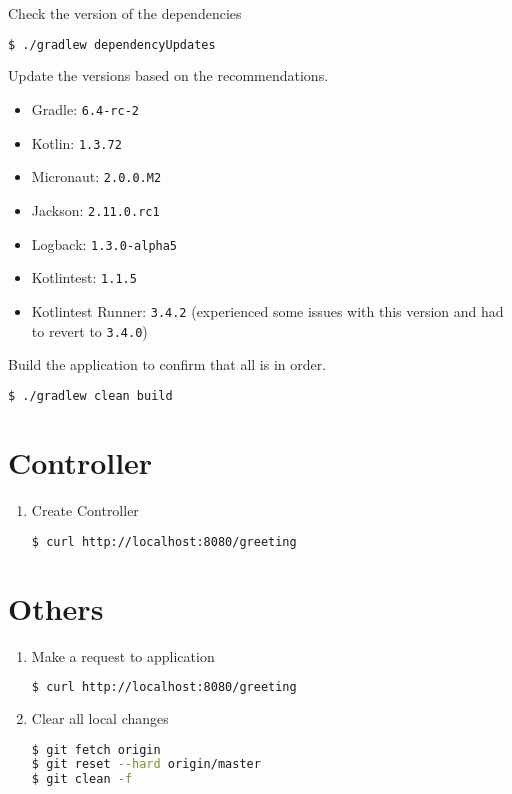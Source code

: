 \documentclass[12pt, letterpaper]{article}
\begin{document}
\begin{enumerate}
{Check the version of the dependencies

\begin{lstlisting}[language=bash]
$ ./gradlew dependencyUpdates
\end{lstlisting}

Update the versions based on the recommendations.

\begin{itemize}
\item  Gradle: \texttt{6.4-rc-2}
\item  Kotlin: \texttt{1.3.72}
\item Micronaut: \texttt{2.0.0.M2}
\item Jackson: \texttt{2.11.0.rc1}
\item Logback: \texttt{1.3.0-alpha5}
\item Kotlintest: \texttt{1.1.5}
\item Kotlintest Runner: \texttt{3.4.2} (experienced some issues with this version and had to revert to \texttt{3.4.0})
\end{itemize}

Build the application to confirm that all is in order.

\begin{lstlisting}[language=bash]
$ ./gradlew clean build
\end{lstlisting}


}
\end{enumerate}

\section{Controller}

\begin{enumerate}

\item  Create Controller

\begin{lstlisting}[language=bash]
$ curl http://localhost:8080/greeting
\end{lstlisting}


\end{enumerate}

\section{Others}

\begin{enumerate}

\item Make a request to application
\begin{lstlisting}[language=bash]
$ curl http://localhost:8080/greeting
\end{lstlisting}


\item Clear all local changes
\begin{lstlisting}[language=bash]
$ git fetch origin
$ git reset --hard origin/master
$ git clean -f
\end{lstlisting}

\end{enumerate}
\end{document}
